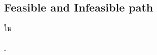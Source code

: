 \subsection{Feasible and Infeasible path}

{\FeasiblePath}ใน{\sourcecode}

\subsubsection{{\InfeasiblePath}}

- 
